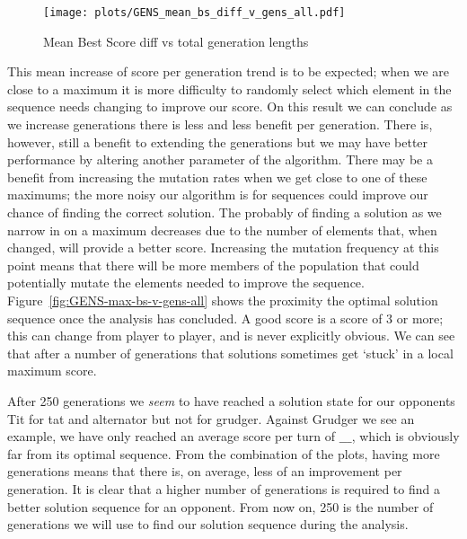 \begin{figure}[ht] [ht]
\texttt{[image: plots/GENS\_mean\_bs\_diff\_v\_gens\_all.pdf]}
\caption{Mean Best Score diff vs total generation lengths}\label{fig:GENS-mean-bs-diff-v-gens-all}
\end{figure}

This mean increase of score per generation trend is to be expected;
when we are close to a maximum it is more difficulty to randomly select which element in the sequence needs changing to improve our score.
On this result we can conclude as we increase generations there is less and less benefit per generation.
There is, however, still a benefit to extending the generations but we may have better performance by altering another parameter of the algorithm.
There may be a benefit from increasing the mutation rates when we get close to one of these maximums;
the more noisy our algorithm is for sequences could improve our chance of finding the correct solution.
The probably of finding a solution as we narrow in on a maximum decreases due to the number of elements that, when changed, will provide a better score.
Increasing the mutation frequency at this point means that there will be more members of the population that could potentially mutate the elements needed to improve the sequence.\\

Figure~\ref{fig:GENS-max-bs-v-gens-all} shows the proximity the optimal solution sequence once the analysis has concluded.
A good score is a score of 3 or more;
this can change from player to player, and is never explicitly obvious.
We can see that after a number of generations that solutions sometimes get `stuck' in a local maximum score.


After 250 generations we \textit{seem} to have reached a solution state for our opponents Tit for tat and alternator but not for grudger.
Against Grudger we see an example, we have only reached an average score per turn of $\_\_\_$, which is obviously far from its optimal sequence.
From the combination of the plots, having more generations means that there is, on average, less of an improvement per generation.
It is clear that a higher number of generations is required to find a better solution sequence for an opponent.
From now on, 250 is the number of generations we will use to find our solution sequence during the analysis.\\

